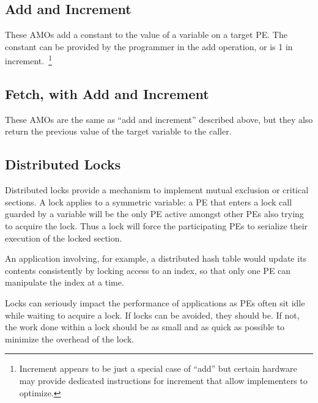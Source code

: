 
\subsection{Add and Increment}

These AMOs add a constant to the value of a variable on a target PE.
The constant can be provided by the programmer in the add operation,
or is 1 in increment.~\footnote{Increment appears to be just a special
  case of ``add'' but certain hardware may provide dedicated
  instructions for increment that allow implementers to optimize.}

\subsection{Fetch, with Add and Increment}

These AMOs are the same as ``add and increment'' described above, but
they also return the previous value of the target variable to the
caller.

\subsection{Distributed Locks}

Distributed locks provide a mechanism to implement mutual exclusion or
critical sections.  A lock applies to a symmetric variable: a PE that
enters a lock call guarded by a variable will be the only PE active
amongst other PEs also trying to acquire the lock.  Thus a lock will
force the participating PEs to serialize their execution of the locked
section.

An application involving, for example, a distributed hash table
 would update its contents
consistently by locking access to an index, so that only one PE can
manipulate the index at a time.

Locks can seriously impact the performance of applications as PEs
often sit idle while waiting to acquire a lock.  If locks can be
avoided, they should be.  If not, the work done within a lock should
be as small and as quick as possible to minimize the overhead of the
lock.
